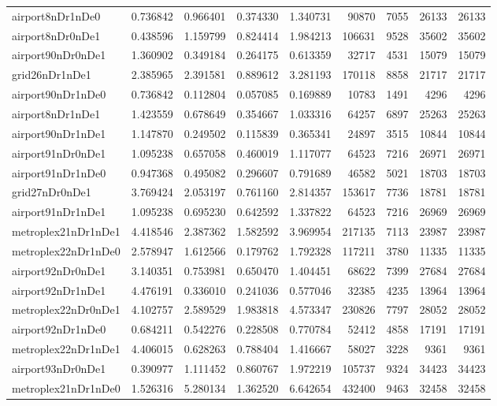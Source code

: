 \begin{longtable}{|l|r|r|r|r|r|r|r|r|}
airport8nDr1nDe0 & 0.736842 & 0.966401 & 0.374330 & 1.340731 & 90870 & 7055 & 26133 & 26133 \\
airport8nDr0nDe1 & 0.438596 & 1.159799 & 0.824414 & 1.984213 & 106631 & 9528 & 35602 & 35602 \\
airport90nDr0nDe1 & 1.360902 & 0.349184 & 0.264175 & 0.613359 & 32717 & 4531 & 15079 & 15079 \\
grid26nDr1nDe1 & 2.385965 & 2.391581 & 0.889612 & 3.281193 & 170118 & 8858 & 21717 & 21717 \\
airport90nDr1nDe0 & 0.736842 & 0.112804 & 0.057085 & 0.169889 & 10783 & 1491 & 4296 & 4296 \\
airport8nDr1nDe1 & 1.423559 & 0.678649 & 0.354667 & 1.033316 & 64257 & 6897 & 25263 & 25263 \\
airport90nDr1nDe1 & 1.147870 & 0.249502 & 0.115839 & 0.365341 & 24897 & 3515 & 10844 & 10844 \\
airport91nDr0nDe1 & 1.095238 & 0.657058 & 0.460019 & 1.117077 & 64523 & 7216 & 26971 & 26971 \\
airport91nDr1nDe0 & 0.947368 & 0.495082 & 0.296607 & 0.791689 & 46582 & 5021 & 18703 & 18703 \\
grid27nDr0nDe1 & 3.769424 & 2.053197 & 0.761160 & 2.814357 & 153617 & 7736 & 18781 & 18781 \\
airport91nDr1nDe1 & 1.095238 & 0.695230 & 0.642592 & 1.337822 & 64523 & 7216 & 26969 & 26969 \\
metroplex21nDr1nDe1 & 4.418546 & 2.387362 & 1.582592 & 3.969954 & 217135 & 7113 & 23987 & 23987 \\
metroplex22nDr1nDe0 & 2.578947 & 1.612566 & 0.179762 & 1.792328 & 117211 & 3780 & 11335 & 11335 \\
airport92nDr0nDe1 & 3.140351 & 0.753981 & 0.650470 & 1.404451 & 68622 & 7399 & 27684 & 27684 \\
airport92nDr1nDe1 & 4.476191 & 0.336010 & 0.241036 & 0.577046 & 32385 & 4235 & 13964 & 13964 \\
metroplex22nDr0nDe1 & 4.102757 & 2.589529 & 1.983818 & 4.573347 & 230826 & 7797 & 28052 & 28052 \\
airport92nDr1nDe0 & 0.684211 & 0.542276 & 0.228508 & 0.770784 & 52412 & 4858 & 17191 & 17191 \\
metroplex22nDr1nDe1 & 4.406015 & 0.628263 & 0.788404 & 1.416667 & 58027 & 3228 & 9361 & 9361 \\
airport93nDr0nDe1 & 0.390977 & 1.111452 & 0.860767 & 1.972219 & 105737 & 9324 & 34423 & 34423 \\
metroplex21nDr1nDe0 & 1.526316 & 5.280134 & 1.362520 & 6.642654 & 432400 & 9463 & 32458 & 32458 \\

\end{longtable}

